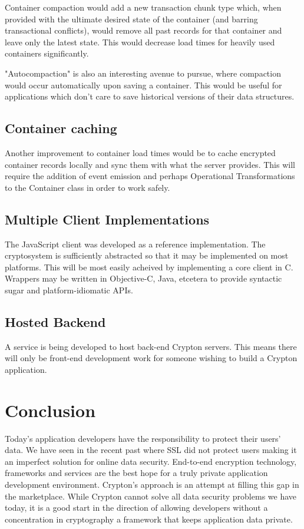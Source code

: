 \documentclass[conference]{IEEEtran}
\begin{document}
Container compaction would add a new transaction chunk type which, when provided with
the ultimate desired state of the container (and barring transactional conflicts),
would remove all past records for that container and leave only the latest state.
This would decrease load times for heavily used containers significantly.

"Autocompaction" is also an interesting avenue to pursue, where compaction would occur
automatically upon saving a container. This would be useful for applications which
don't care to save historical versions of their data structures.

\subsection{Container caching}
Another improvement to container load times would be to cache encrypted container
records locally and sync them with what the server provides. This will require the
addition of event emission and perhaps Operational Transformations to the Container
class in order to work safely.

\subsection{Multiple Client Implementations}
The JavaScript client was developed as a reference implementation. The cryptosystem
is sufficiently abstracted so that it may be implemented on most platforms. This
will be most easily acheived by implementing a core client in C. Wrappers may be
written in Objective-C, Java, etcetera to provide syntactic sugar and
platform-idiomatic APIs.

\subsection{Hosted Backend}
A service is being developed to host back-end Crypton servers. This means there
will only be front-end development work for someone wishing to build a Crypton
application.

\section{Conclusion}
Today's application developers have the responsibility to protect their users' data.
We have seen in the recent past where SSL did not protect users\cite{SSLImpersonation}
making it an imperfect solution for online data security. End-to-end encryption
technology, frameworks and services are the best hope for a truly private application
development environment. Crypton's approach is an attempt at filling this gap in the
marketplace. While Crypton cannot solve all data security problems we have today, it is
a good start in the direction of allowing developers without a concentration in
cryptography a framework that keeps application data private.
\end{document}
